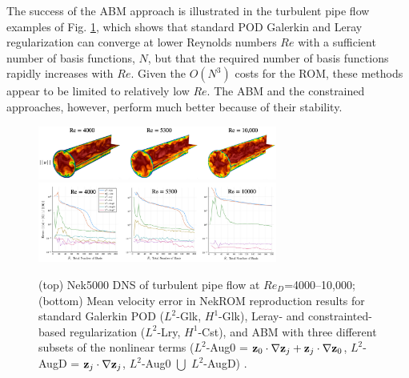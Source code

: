 The success of the ABM approach is illustrated in the turbulent pipe flow
examples of Fig. \ref{fig:abm}, which shows that standard POD Galerkin
and Leray regularization can converge at lower Reynolds numbers $Re$
with a sufficient number of basis functions, $N$, but that the required
number of basis functions rapidly increases with $Re$.  Given the $O(N^3)$
costs for the ROM, these methods appear to be limited to relatively low
$Re$.  The ABM and the constrained approaches, however, perform much better
because of their stability.

\begin{figure}[t!] \centering
    \includegraphics[width = 0.70\textwidth]{figs/kaneko_diss_pipe_pics.png}
    \includegraphics[width = 0.70\textwidth]{figs/kaneko_diss_pipe_ubar.png}
\caption{
(top) Nek5000 DNS of turbulent pipe flow at $Re_D$=4000--10,000;
(bottom) Mean velocity error in NekROM reproduction results for standard
Galerkin POD ($L^2$-Glk, $H^1$-Glk), 
Leray- and constrainted-based regularization
($L^2$-Lry, $H^1$-Cst), and 
ABM with three different subsets of the nonlinear terms
($L^2$-Aug0 = $ {\bf z}_0 \cdot \nabla {\bf z}_j+ {\bf z}_j \cdot \nabla {\bf z}_0$,
$L^2$-AugD = $ {\bf z}_j \cdot \nabla {\bf z}_j$,
$L^2$-Aug0 $\bigcup$ $L^2$-AugD) \cite{kaneko22a,kaneko22}.
\label{fig:abm}}
\end{figure}





